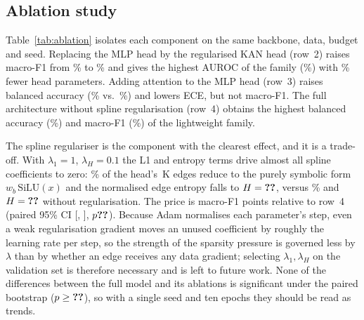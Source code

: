 \documentclass[conference]{IEEEtran}
\begin{document}
\subsection{Ablation study}
Table~\ref{tab:ablation} isolates each component on the same backbone, data, budget and seed. Replacing the MLP head by the regularised KAN head (row~2) raises macro-F1 from \% to \% and gives the highest AUROC of the family (\%) with \% fewer head parameters. Adding attention to the MLP head (row~3) raises balanced accuracy (\% vs.\ \%) and lowers ECE, but not macro-F1. The full architecture without spline regularisation (row~4) obtains the highest balanced accuracy (\%) and macro-F1 (\%) of the lightweight family.

The spline regulariser is the component with the clearest effect, and it is a trade-off. With $\lambda_1=1$, $\lambda_H=0.1$ the L1 and entropy terms drive almost all spline coefficients to zero: \% of the head's \,K edges reduce to the purely symbolic form $w_b\,\mathrm{SiLU}(x)$ and the normalised edge entropy falls to $H=\res{att_convkan_proposed}{kan_spline_entropy}$, versus \% and $H=\res{ablation_4_full_no_spline_reg}{kan_spline_entropy}$ without regularisation. The price is  macro-F1 points relative to row~4 (paired 95\% CI [, ], $p\res{paired@ablation_4_full_no_spline_reg}{p_value}$). Because Adam normalises each parameter's step, even a weak regularisation gradient moves an unused coefficient by roughly the learning rate per step, so the strength of the sparsity pressure is governed less by $\lambda$ than by whether an edge receives any data gradient; selecting $\lambda_1,\lambda_H$ on the validation set is therefore necessary and is left to future work. None of the differences between the full model and its ablations is significant under the paired bootstrap ($p\ge\res{derived}{min_ablation_p}$), so with a single seed and ten epochs they should be read as trends.
\end{document}
